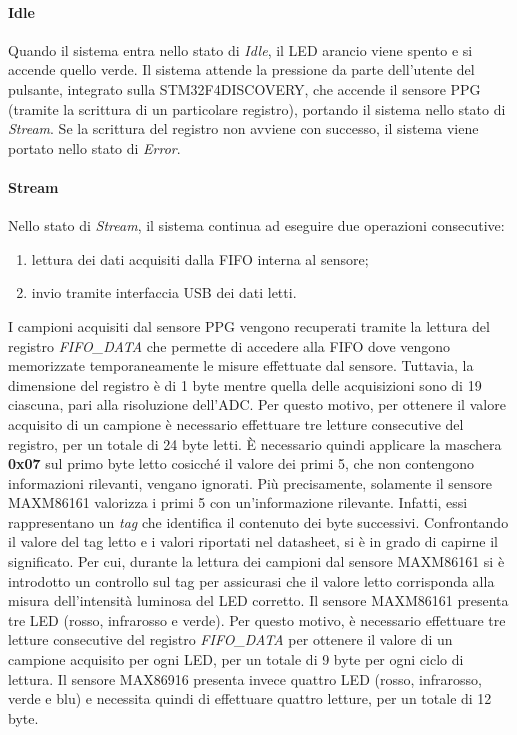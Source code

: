 \paragraph{Idle}
Quando il sistema entra nello stato di \textit{Idle}, il LED arancio viene spento e si accende quello verde. Il sistema attende la pressione da parte dell'utente del pulsante, integrato sulla STM32F4DISCOVERY, che accende il sensore PPG (tramite la scrittura di un particolare registro), portando il sistema nello stato di \textit{Stream}. Se la scrittura del registro non avviene con successo, il sistema viene portato nello stato di \textit{Error}.
\paragraph{Stream}
Nello stato di \textit{Stream}, il sistema continua ad eseguire due operazioni consecutive:
\begin{enumerate}
	\item lettura dei dati acquisiti dalla FIFO interna al sensore;
	\item invio tramite interfaccia USB dei dati letti.
\end{enumerate}
I campioni acquisiti dal sensore PPG vengono recuperati tramite la lettura del registro \textit{FIFO\_DATA} che permette di accedere alla FIFO dove vengono memorizzate temporaneamente le misure effettuate dal sensore. Tuttavia, la dimensione del registro è di 1 byte mentre quella delle acquisizioni sono di \SI{19}{\bit} ciascuna, pari alla risoluzione dell'ADC. Per questo motivo, per ottenere il valore acquisito di un campione è necessario effettuare tre letture consecutive del registro, per un totale di 24 byte letti. \`E necessario quindi applicare la maschera \textbf{0x07} sul primo byte letto cosicché il valore dei primi \SI{5}{\bit}, che non contengono informazioni rilevanti, vengano ignorati. Più precisamente, solamente il sensore MAXM86161 valorizza i primi \SI{5}{\bit} con un'informazione rilevante. Infatti, essi rappresentano un \textit{tag} che identifica il contenuto dei byte successivi. Confrontando il valore del tag letto e i valori riportati nel datasheet, si è in grado di capirne il significato. Per cui, durante la lettura dei campioni dal sensore MAXM86161 si è introdotto un controllo sul tag per assicurasi che il valore letto corrisponda alla misura dell'intensità luminosa del LED corretto. Il sensore MAXM86161 presenta tre LED (rosso, infrarosso e verde). Per questo motivo, è necessario effettuare tre letture consecutive del registro \textit{FIFO\_DATA} per ottenere il valore di un campione acquisito per ogni LED, per un totale di 9 byte per ogni ciclo di lettura. Il sensore MAX86916 presenta invece quattro LED (rosso, infrarosso, verde e blu) e necessita quindi di effettuare quattro letture, per un totale di 12 byte.

